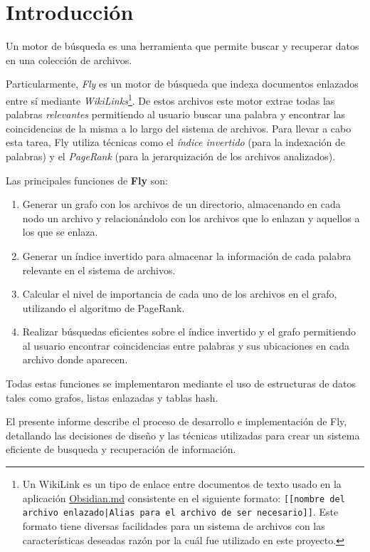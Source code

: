 \section{Introducción}
Un motor de búsqueda es una herramienta que permite buscar y recuperar datos en una colección de archivos.

Particularmente, \textit{Fly} es un motor de búsqueda que indexa documentos enlazados entre sí mediante \textit{WikiLinks}\footnote{Un WikiLink es un tipo de enlace entre documentos de texto usado en la aplicación \href{https://obsidian.md/}{Obsidian.md} consistente en el siguiente formato: \texttt{[[nombre del archivo enlazado|Alias para el archivo de ser necesario]]}. Este formato tiene diversas facilidades para un sistema de archivos con las características deseadas razón por la cuál fue utilizado en este proyecto.}. De estos archivos este motor extrae todas las palabras \textit{relevantes} permitiendo al usuario buscar una palabra y encontrar las coincidencias de la misma a lo largo del sistema de archivos. Para llevar a cabo esta tarea, Fly utiliza técnicas como el \textit{índice invertido} (para la indexación de palabras) y el \textit{PageRank} (para la jerarquización de los archivos analizados).

Las principales funciones de \textbf{Fly} son:
\begin{enumerate}
    \item Generar un grafo con los archivos de un directorio, almacenando en cada nodo un archivo y relacionándolo con los archivos que lo enlazan y aquellos a los que se enlaza.
    \item Generar un índice invertido para almacenar la información de cada palabra relevante en el sistema de archivos.
    \item Calcular el nivel de importancia de cada uno de los archivos en el grafo, utilizando el algoritmo de PageRank.
    \item Realizar búsquedas eficientes sobre el índice invertido y el grafo permitiendo al usuario encontrar coincidencias entre palabras y sus ubicaciones en cada archivo donde aparecen.
\end{enumerate}

Todas estas funciones se implementaron mediante el uso de estructuras de datos tales como grafos, listas enlazadas y tablas hash.

El presente informe describe el proceso de desarrollo e implementación de Fly, detallando las decisiones de diseño y las técnicas utilizadas para crear un sistema eficiente de busqueda y recuperación de información.